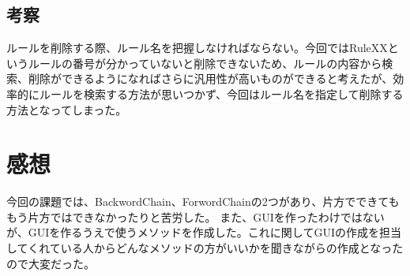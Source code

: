 \documentclass[a4j]{jarticle}
\begin{document}
\subsection{考察}
ルールを削除する際、ルール名を把握しなければならない。今回ではRuleXXというルールの番号が分かっていないと削除できないため、ルールの内容から検索、削除ができるようになればさらに汎用性が高いものができると考えたが、効率的にルールを検索する方法が思いつかず、今回はルール名を指定して削除する方法となってしまった。
\section{感想}
今回の課題では、BackwordChain、ForwordChainの2つがあり、片方でできてももう片方ではできなかったりと苦労した。
また、GUIを作ったわけではないが、GUIを作るうえで使うメソッドを作成した。これに関してGUIの作成を担当してくれている人からどんなメソッドの方がいいかを聞きながらの作成となったので大変だった。
\end{document}
